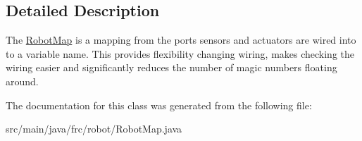 \subsection{Detailed Description}
The \hyperlink{classfrc_1_1robot_1_1_robot_map}{Robot\+Map} is a mapping from the ports sensors and actuators are wired into to a variable name. This provides flexibility changing wiring, makes checking the wiring easier and significantly reduces the number of magic numbers floating around. 

The documentation for this class was generated from the following file\+:\begin{DoxyCompactItemize}
\item 
src/main/java/frc/robot/Robot\+Map.\+java\end{DoxyCompactItemize}
